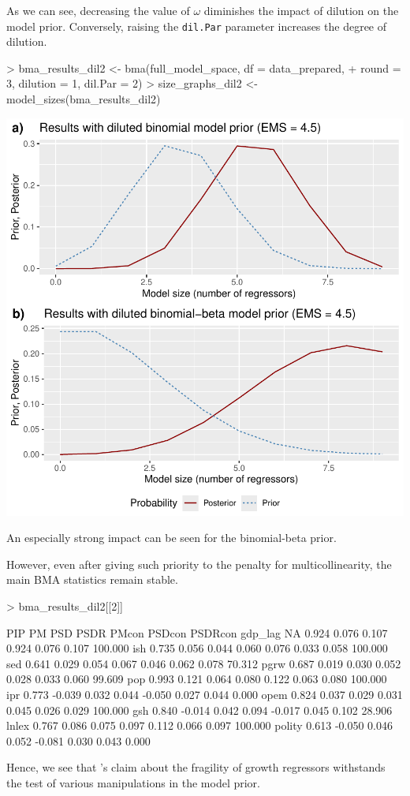 \documentclass[a4paper]{article}
\begin{document}
\noindent As we can see, decreasing the value of $\omega$ diminishes the impact of dilution on the model prior.
Conversely, raising the \verb+dil.Par+ parameter increases the degree of dilution.
\begin{Schunk}
\begin{Sinput}
> bma_results_dil2 <- bma(full_model_space, df = data_prepared,
+                        round = 3, dilution = 1, dil.Par = 2)
> size_graphs_dil2 <- model_sizes(bma_results_dil2)
\end{Sinput}
\end{Schunk}
\includegraphics{bdsm_vignette-042}

\noindent An especially strong impact can be seen for the binomial-beta prior.

However, even after giving such priority to the penalty for multicollinearity,
the main BMA statistics remain stable.
\begin{Schunk}
\begin{Sinput}
> bma_results_dil2[[2]]
\end{Sinput}
\begin{Soutput}
          PIP     PM   PSD  PSDR  PMcon PSDcon PSDRcon    %
gdp_lag    NA  0.924 0.076 0.107  0.924  0.076   0.107 100.000
ish     0.735  0.056 0.044 0.060  0.076  0.033   0.058 100.000
sed     0.641  0.029 0.054 0.067  0.046  0.062   0.078  70.312
pgrw    0.687  0.019 0.030 0.052  0.028  0.033   0.060  99.609
pop     0.993  0.121 0.064 0.080  0.122  0.063   0.080 100.000
ipr     0.773 -0.039 0.032 0.044 -0.050  0.027   0.044   0.000
opem    0.824  0.037 0.029 0.031  0.045  0.026   0.029 100.000
gsh     0.840 -0.014 0.042 0.094 -0.017  0.045   0.102  28.906
lnlex   0.767  0.086 0.075 0.097  0.112  0.066   0.097 100.000
polity  0.613 -0.050 0.046 0.052 -0.081  0.030   0.043   0.000
\end{Soutput}
\end{Schunk}
Hence, we see that \citet{Moral+2016}’s claim about the fragility of growth regressors withstands the test of various manipulations in the model prior.
\end{document}
